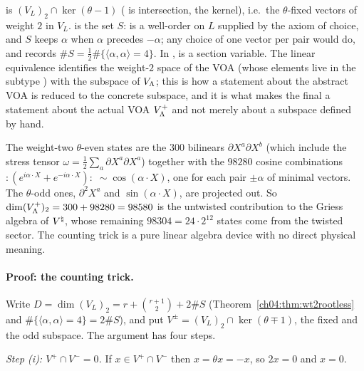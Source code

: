 \begin{dictionary}
 is $(V_L)_2\cap\ker(\theta-1)$ ( is intersection,  the
kernel), i.e.\ the $\theta$-fixed vectors of weight $2$ in $V_L$.  is the set
$S$:  is a well-order on $L$ supplied by the axiom of choice, and $S$ keeps
$\alpha$ when $\alpha$ precedes $-\alpha$; any choice of one vector per pair would do, and
 records $\#S=\tfrac12\#\{\langle\alpha,\alpha\rangle=4\}$. In
,  is a section variable. The linear equivalence
 identifies the weight-$2$ space of the VOA 
(whose elements live in the subtype ) with the subspace  of
$V_{\Lambda}$; this is how a statement about the abstract VOA is reduced to the concrete subspace, and
it is what makes the final  a statement about the actual
VOA $V_{\Lambda}^+$ and not merely about a subspace defined by hand.
\end{dictionary}

\begin{physics}
The weight-two $\theta$-even states are the $300$ bilinears $\partial X^a\partial X^b$ (which include the stress tensor $\omega=\tfrac12\sum_a\partial X^a\partial X^a$) together with the $98280$ cosine combinations $:\!(e^{i\alpha\cdot X}+e^{-i\alpha\cdot X})\!:\;\sim\cos(\alpha\cdot X)$, one for each pair $\pm\alpha$ of minimal vectors. The $\theta$-odd ones, $\partial^2X^a$ and $\sin(\alpha\cdot X)$, are projected out. So $\dim(V_{\Lambda}^+)_2=300+98280=98580$ is the untwisted contribution to the Griess algebra of ${V^{\natural}}$, whose remaining $98304=24\cdot2^{12}$ states come from the twisted sector. The counting trick is a pure linear algebra device with no direct physical meaning.
\end{physics}

\paragraph{Proof: the counting trick.} Write $D=\dim(V_L)_2=r+\binom{r+1}2+2\#S$
(Theorem~\ref{ch04:thm:wt2rootless} and $\#\{\langle\alpha,\alpha\rangle=4\}=2\#S$), and put
$V^\pm=(V_L)_2\cap\ker(\theta\mp1)$, the fixed and the odd subspace. The argument has four steps.

\emph{Step (i): $V^+\cap V^-=0$.} If $x\in V^+\cap V^-$ then $x=\theta x=-x$, so $2x=0$ and $x=0$.

